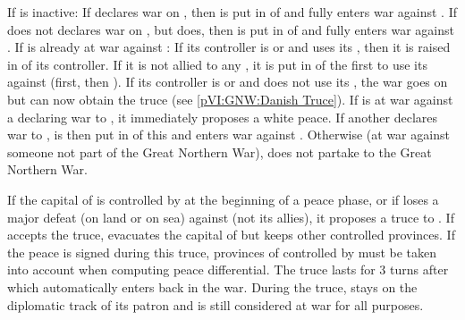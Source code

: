 \begin{digressions}


  \aparag If \paysdanemark is inactive:
  \bparag If \RUS declares war on \SUE, then \paysdanemark is put in \CE of
  \RUS and fully enters war against \SUE.
  \bparag If \RUS does not declares war on \SUE, but \POL does, then
  \paysdanemark is put in \CE of \POL and fully enters war against \SUE.
  \aparag If \paysdanemark is already at war against \SUE:
  \bparag If its controller is \RUS or \POL and uses its \CB, then it is
  raised in \EG of its controller.
  \bparag If it is not allied to any \MAJ, it is put in \EC of the first \MAJ
  to use its \CB against \SUE (\RUS first, then \POL).
  \bparag If its controller is \RUS or \POL and does not use its \CB, the war
  goes on but \SUE can now obtain the truce (see \ref{pVI:GNW:Danish Truce}).
  \bparag If \paysdanemark is at war against a \MAJ declaring war to \SUE, it
  immediately proposes a white peace. If another \MAJ declares war to \SUE,
  \paysdanemark is then put in \CE of this \MAJ and enters war against \SUE.
  \aparag Otherwise (\paysdanemark at war against someone not part of the
  Great Northern War), \paysdanemark does not partake to the Great Northern
  War.

  \phpaix
  \aparag\label{pVI:GNW:Danish Truce} If the capital of \paysdanemark is
  controlled by \SUE at the beginning of a peace phase, or if \paysdanemark
  loses a major defeat (on land or on sea) against \SUE (not its allies), it
  proposes a truce to \SUE.
  \bparag If \SUE accepts the truce, \SUE evacuates the capital of
  \paysdanemark but keeps other controlled provinces.
  \bparag If the peace is signed during this truce, provinces of \paysdanemark
  controlled by \SUE must be taken into account when computing peace
  differential.
  \bparag The truce lasts for 3 turns after which \paysdanemark automatically
  enters back in the war.
  \bparag During the truce, \paysdanemark stays on the diplomatic track of its
  patron and is still considered at war for all purposes.



\end{digressions}
